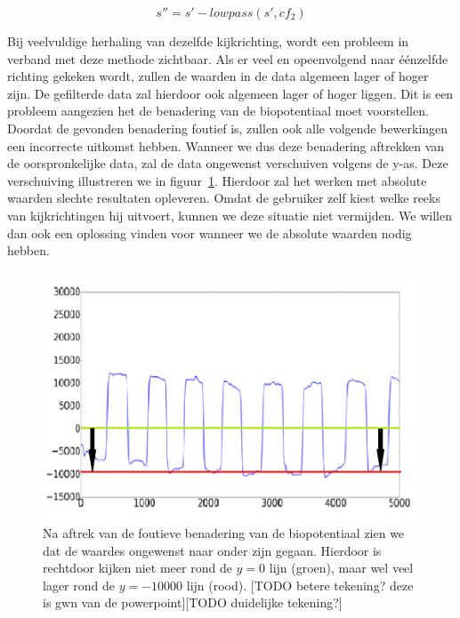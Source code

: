 \documentclass{article}
\begin{document}
\begin{equation}
\label{eq:aftrekkingbiopotentiaal}
s'' = s' - lowpass(s', cf_2)
\end{equation}

Bij veelvuldige herhaling van dezelfde kijkrichting, wordt een probleem in verband met deze methode zichtbaar. Als er veel en opeenvolgend naar éénzelfde richting gekeken wordt, zullen de waarden in de data algemeen lager of hoger zijn. De gefilterde data zal hierdoor ook algemeen lager of hoger liggen. Dit is een probleem aangezien het de benadering van de biopotentiaal moet voorstellen. Doordat de gevonden benadering foutief is, zullen ook alle volgende bewerkingen een incorrecte uitkomst hebben. Wanneer we dus deze benadering aftrekken van de oorspronkelijke data, zal de data ongewenst verschuiven volgens de y-as. Deze verschuiving illustreren we in figuur~\ref{fig:bio_fout}.   Hierdoor zal het werken met absolute waarden slechte resultaten opleveren. Omdat de gebruiker zelf kiest welke reeks van kijkrichtingen hij uitvoert, kunnen we deze situatie niet vermijden. We willen dan ook een oplossing vinden voor wanneer we de absolute waarden nodig hebben.

\begin{figure}[h]
\centering
\includegraphics[width=\linewidth]{images/bio_fout}
\caption{Na aftrek van de foutieve benadering van de biopotentiaal zien we dat de waardes ongewenst naar onder zijn gegaan. Hierdoor is rechtdoor kijken niet meer rond de $y = 0$ lijn (groen), maar wel veel lager rond de $y = -10000$ lijn (rood). [TODO betere tekening? deze is gwn van de powerpoint][TODO duidelijke tekening?]}
\label{fig:bio_fout}
\end{figure}
\end{document}
